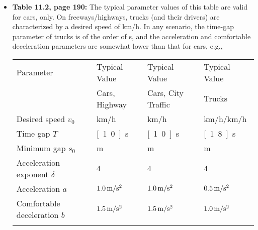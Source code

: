 \documentclass[11pt,a4paper]{scrreprt}
\begin{document}
\begin{itemize}
\item \textbf{Table 11.2, page 190:}
The typical parameter values of this table are valid for cars, only. On freeways/highways, trucks (and
their drivers) are characterized by a desired speed of
\unit[80]{km/h}. In any scenario, the time-gap parameter of  trucks is
 of the order of \unit[2]{s}, and the 
acceleration and comfortable deceleration parameters are somewhat
lower than that for cars, e.g.,


{\small
\centering
\begin{tabular}{p{}p{}p{}p{}}
\hline\noalign{\smallskip}
Parameter & Typical Value & Typical Value & Typical Value \\
 & Cars, Highway & Cars, City Traffic & Trucks \\
\noalign{\smallskip}\hline\noalign{\smallskip}
Desired speed $v_0$ & \unit[120]{km/h} & \unit[54]{km/h} & \unit[50]{km/h}/\unit[80]{km/h} \\
Time gap $T$ & \unit[1.0]{s} & \unit[1.0]{s} & \unit[1.8]{s} \\
Minimum gap $s_0$ & \unit[2]{m} & \unit[2]{m} & \unit[3]{m} \\
Acceleration exponent $\delta$ & 4 & 4 & 4 \\
Acceleration $a$ & $\unit[1.0]{m/s^2}$ & $\unit[1.0]{m/s^2}$ & $\unit[0.5]{m/s^2}$ \\
Comfortable deceleration $b$ & $\unit[1.5]{m/s^2}$ & $\unit[1.5]{m/s^2}$ & $\unit[1.0]{m/s^2}$ \\
\noalign{\smallskip}\hline\noalign{\smallskip}
\end{tabular}
}

\end{itemize}
\end{document}
